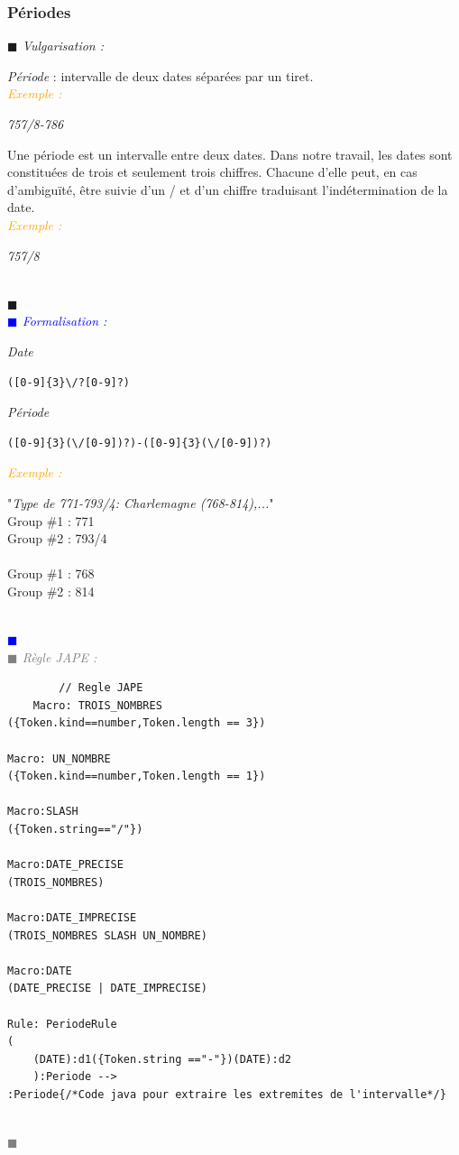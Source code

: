 \documentclass[a4paper, 11pt]{report}
\newenvironment{vulgarisation}
    {
    \textit{\textcolor{dark-blue}{$\blacksquare$  Vulgarisation : \\}}

    }
    {
    ~\\\textcolor{dark-blue}{$\blacksquare$}\\
    }
\newenvironment{formalisation}
    {
    \textit{\textcolor{blue}{$\blacksquare$  Formalisation : \\}}
    }
    {
    ~\\\textcolor{blue}{$\blacksquare$}\\
    }
\newenvironment{codage}
    {
    \textit{\textcolor{gray}{$\blacksquare$  Règle JAPE : \\}}
    }
    {
    ~\\\textcolor{gray}{$\blacksquare$}\\
    }
\newenvironment{exemple}
    {
    \textit{\textcolor{orange}{
    Exemple : \\}}
    }
    {\\
    }
\begin{document}
	\subsubsection{Périodes}
\begin{vulgarisation}
	\textit{Période} : intervalle de deux dates séparées par un tiret.\\
	\begin{exemple}
		\textit{757/8-786}
	\end{exemple}
	
	Une période est un intervalle entre deux dates. Dans notre travail, les dates sont constituées de trois et seulement trois chiffres. Chacune d'elle peut, en cas d’ambiguïté, être suivie d'un \og/\fg{} et d'un chiffre traduisant l'indétermination de la date.\\
	\begin{exemple}
		\textit{757/8}
	\end{exemple}
	
\end{vulgarisation}
\begin{formalisation}
	\textit{Date}
	\begin{verbatim}
([0-9]{3}\/?[0-9]?)
	\end{verbatim}
	\textit{Période}
	\begin{verbatim}
([0-9]{3}(\/[0-9])?)-([0-9]{3}(\/[0-9])?)
	\end{verbatim}
	\begin{exemple}
		"\emph{Type de 771-793/4: Charlemagne (768-814),...}" \\
		Group \#1 : 771 \\
		Group \#2 : 793/4\\\\\noindent
		Group \#1 : 768 \\
		Group \#2 : 814
	\end{exemple}
\end{formalisation}
	\begin{codage}
	\begin{lstlisting}
		// Regle JAPE
	Macro: TROIS_NOMBRES
({Token.kind==number,Token.length == 3})

Macro: UN_NOMBRE
({Token.kind==number,Token.length == 1})

Macro:SLASH
({Token.string=="/"})

Macro:DATE_PRECISE
(TROIS_NOMBRES)

Macro:DATE_IMPRECISE
(TROIS_NOMBRES SLASH UN_NOMBRE)

Macro:DATE
(DATE_PRECISE | DATE_IMPRECISE)

Rule: PeriodeRule
(
	(DATE):d1({Token.string =="-"})(DATE):d2
    ):Periode -->
:Periode{/*Code java pour extraire les extremites de l'intervalle*/}
	\end{lstlisting}
	\end{codage}
	
\end{document}
